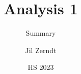 \documentclass[a4paper, fontsize = 8pt, landscape]{scrartcl}
\title{Analysis 1}
\subtitle{Summary}
\author{Jil Zerndt}
\date{HS 2023}
\begin{document}
\begin{multicols}{2}
	\thispagestyle{TitlePageStyle}
	\maketitleinfo
	\sffamily
	
	\raggedcolumns
	\pagebreak
	
	\raggedcolumns
	\pagebreak
	\raggedcolumns
	\pagebreak
	\raggedcolumns
	\pagebreak
	\raggedcolumns
	\pagebreak
	\raggedcolumns
\end{multicols}
\end{document}

